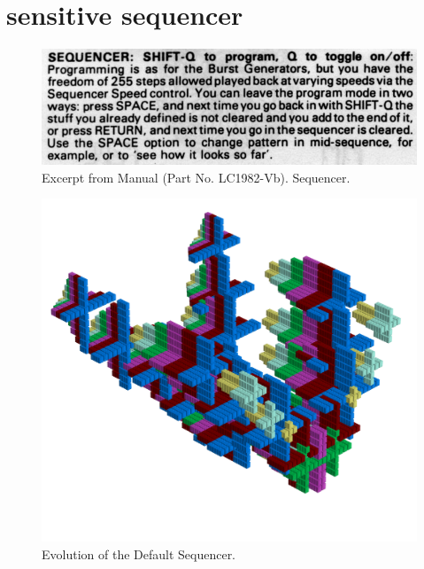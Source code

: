 \chapter{sensitive sequencer} 
\label{sec:sequencer}
\lstset{style=6502Style}

\begin{figure}[H]
    \centering
    \begin{adjustbox}{width=10.5cm,margin=0cm}
      \includegraphics[width=12cm]{src/sequencer/sequencer.png}%
    \end{adjustbox}
    \caption{
      Excerpt from Manual (Part No. LC1982-Vb). Sequencer.
      }
\end{figure}


\clearpage                                                                 
\begin{figure}[H]                                                          
    \centering                                                             
    \begin{adjustbox}{width=14cm,center, margin= 0cm 2cm}                                   
      \includegraphics[width=14cm]{src/sequencer/pattern0-45.png}%
    \end{adjustbox}                                                        
\caption{Evolution of the Default Sequencer.}                                           
\end{figure}                                                               
\clearpage                                                                 
                                                                           
